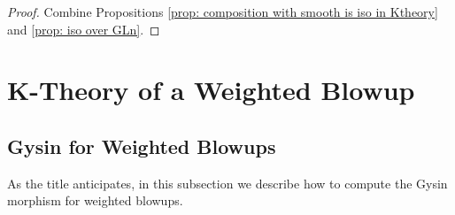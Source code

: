 \documentclass[12pt]{amsart}
\theoremstyle{definition}
\begin{document}
\begin{proof}
    Combine Propositions \ref{prop: composition with smooth is iso in Ktheory} and \ref{prop: iso over GLn}.
\end{proof}

\section{K-Theory of a Weighted Blowup}\label{sec:K-theory-weighted-blowups}

\subsection{Gysin for Weighted Blowups}\label{sub: Gysin for Weighted Blowups}

As the title anticipates, in this subsection we describe how to compute the Gysin morphism for weighted blowups.
\end{document}
